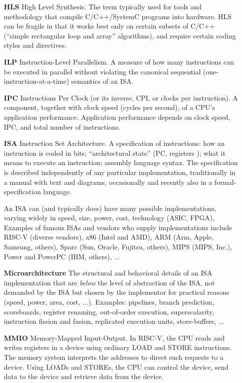 \begin{itemize}
\item[\bf HLS] High Level Synthesis.  The term typically used for
  tools and methodology that compile C/C++/SystemC programs into
  hardware.  HLS can be fragile in that it works best only on certain
  subsets of C/C++ (``simple rectangular loop and array'' algorithms),
  and require certain coding styles and directives.

\item[\bf ILP] Instruction-Level Parallelism.  A measure of how many
  instructions can be executed in parallel without violating the
  canonical sequential (one-instruction-at-a-time) semantics of an
  ISA.

\item[\bf IPC] Instructions Per Clock (or its inverse, CPI, or clocks
  per instruction).  A component, together with clock speed (cycles
  per second), of a CPU's application performance.  Application
  performance depends on clock speed, IPC, and total number of
  instructions.

\item[\bf ISA] Instruction Set Architecture.  A specification of
  instructions: how an instruction is coded in bits; ``architectural
  state'' (PC, registers {\etc}); what it means to execute an
  instruction; assembly language syntax.  The specification is
  described independently of any particular implementation,
  traditionally in a manual with text and diagrams, occasionally and
  recently also in a formal-specification language.

  An ISA can (and typically does) have many possible implementations,
  varying widely in speed, size, power, cost, technology (ASIC, FPGA),
  {\etc} Examples of famous ISAs and vendors who supply
  implementations include RISC-V (diverse vendors), x86 (Intel and
  AMD), ARM (Arm, Apple, Samsung, others), Sparc (Sun, Oracle,
  Fujitsu, others), MIPS (MIPS, Inc.), Power and PowerPC (IBM,
  others), ...

\item[\bf Microarchitecture] The structural and behavioral details of
  an ISA implementation that are \emph{below} the level of abstraction
  of the ISA, {\ie} not demanded by the ISA but chosen by the
  implementor for practical reasons (speed, power, area, cost, ...).
  Examples: pipelines, branch prediction, scoreboards, register
  renaming, out-of-order execution, superscalarity, instruction
  fission and fusion, replicated execution units, store-buffers, ...

\item[\bf MMIO] Memory-Mapped Input-Output.  In RISC-V, the CPU reads
  and writes registers in a device using ordinary LOAD and STORE
  instructions.  The memory system interprets the addresses to direct
  such requests to a device.  Using LOADs and STOREs, the CPU can
  control the device, send data to the device and retrieve data from
  the device.


\end{itemize}
